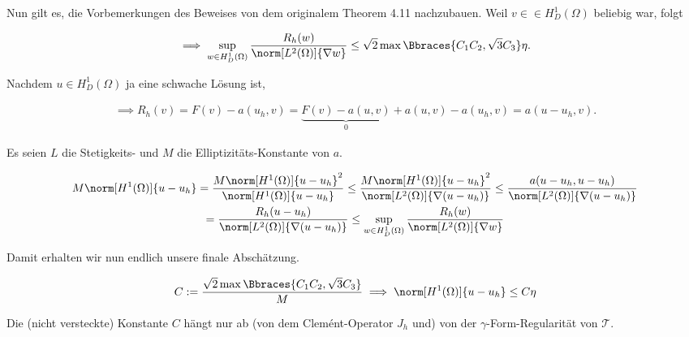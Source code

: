 \begin{solution}
\begin{enumerate}[label = \textbf{\alph*)}]
  Nun gilt es, die Vorbemerkungen des Beweises von dem originalem Theorem 4.11 nachzubauen.
  Weil $v \in \in H_D^1(\Omega)$ beliebig war, folgt

  \begin{align*}
    \implies
    \sup_{w \in H_D^1(\Omega)}
    \frac
    {
      R_h(w)
    }{
      \norm[L^2(\Omega)]{\nabla w}
    }
    \leq
    \sqrt{2}
    \max \Bbraces{C_1 C_2, \sqrt{3} C_3}
    \eta.
  \end{align*}

  Nachdem $u \in H_D^1(\Omega)$ ja eine schwache Lösung ist,

  \begin{align*}
    \implies
    R_h(v)
    =
    F(v) - a(u_h, v)
    =
    \underbrace
    {
      F(v) - a(u, v)
    }_0
    +
    a(u, v)
    -
    a(u_h, v)
    =
    a(u - u_h, v).
  \end{align*}

  Es seien $L$ die Stetigkeits- und $M$ die Elliptizitäts-Konstante von $a$.

  \begin{multline*}
    M \norm[H^1(\Omega)]{u - u_h}
    =
    \frac
    {
      M \norm[H^1(\Omega)]{u - u_h}^2
    }{
      \norm[H^1(\Omega)]{u - u_h}
    }
    \leq
    \frac
    {
      M \norm[H^1(\Omega)]{u - u_h}^2
    }{
      \norm[L^2(\Omega)]{\nabla (u - u_h)}
    }
    \leq
    \frac
    {
      a(u - u_h, u - u_h)
    }{
      \norm[L^2(\Omega)]{\nabla (u - u_h)}
    } \\
    =
    \frac
    {
      R_h(u - u_h)
    }{
      \norm[L^2(\Omega)]{\nabla (u - u_h)}
    }
    \leq
    \sup_{w \in H_D^1(\Omega)}
    \frac
    {
      R_h(w)
    }{
      \norm[L^2(\Omega)]{\nabla w}
    }
  \end{multline*}

  Damit erhalten wir nun endlich unsere finale Abschätzung.

  \begin{align*}
    C
    :=
    \frac
    {
      \sqrt{2}
      \max \Bbraces{C_1 C_2, \sqrt{3} C_3}
    }{
      M
    }
    \implies
    \norm[H^1(\Omega)]{u - u_h}
    \leq
    C \eta
  \end{align*}

  Die (nicht versteckte) Konstante $C$ hängt nur ab (von dem Clemént-Operator $J_h$ und) von der $\gamma$-Form-Regularität von $\mathcal{T}$.

\end{enumerate}

\end{solution}

